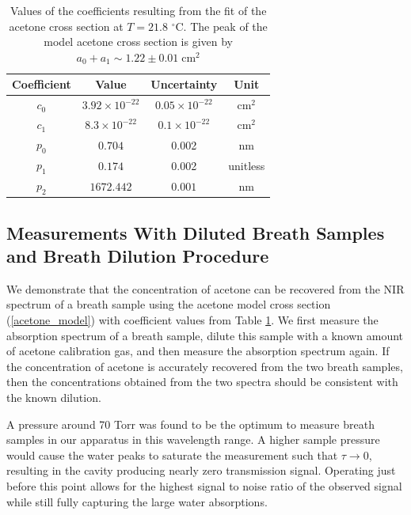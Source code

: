 \documentclass[12pt]{report}
\begin{document}
	\begin{table}[H]
		\begin{center}
			\caption{ Values of the coefficients resulting from the fit of the acetone cross section at $T=21.8$ $^\circ$C. The peak of the model acetone cross section is given by $a_0 + a_1 \sim 1.22 \pm 0.01\;\mathrm{cm}^2$}\label{table:acetone_coeffs}
			\begin{tabular}{|c|c|c|c|}
				\hline
				\textbf{Coefficient} & \textbf{Value} & \textbf{Uncertainty} & \textbf{Unit} \\
				\hline
				$c_0$ & $3.92\times10^{-22}$ & $0.05\times10^{-22}$ & $\mathrm{cm}^2$ \\
				\hline
				$c_1$ & $8.3\times10^{-22}$ & $0.1\times10^{-22}$ & $\mathrm{cm^2}$ \\
				\hline
				$p_0$ & $0.704$ & 0.002 & nm \\
				\hline
				$p_1$ & $0.174$ & 0.002 & unitless \\
				\hline
				$p_2$ & $1672.442$ & $0.001$ & nm \\
				\hline
			\end{tabular}
		\end{center}
	\end{table}
	
	\subsection{Measurements With Diluted Breath Samples and Breath Dilution Procedure} \label{sec:breath_dilution}
	
	We demonstrate that the concentration of acetone can be recovered from the NIR spectrum of a breath sample using the acetone model cross section (\ref{acetone_model}) with coefficient values from Table \ref{table:acetone_coeffs}. We first measure the absorption spectrum of a breath sample, dilute this sample with a known amount of acetone calibration gas, and then measure the absorption spectrum again. If the concentration of acetone is accurately recovered from the two breath samples, then the concentrations obtained from the two spectra should be consistent with the known dilution.
	
	A pressure around 70 Torr was found to be the optimum to measure breath samples in our apparatus in this wavelength range. A higher sample pressure would cause the water peaks to saturate the measurement such that $\tau \rightarrow 0$, resulting in the cavity producing nearly zero transmission signal. Operating just before this point allows for the highest signal to noise ratio of the observed signal while still fully capturing the large water absorptions.
	
\end{document}
